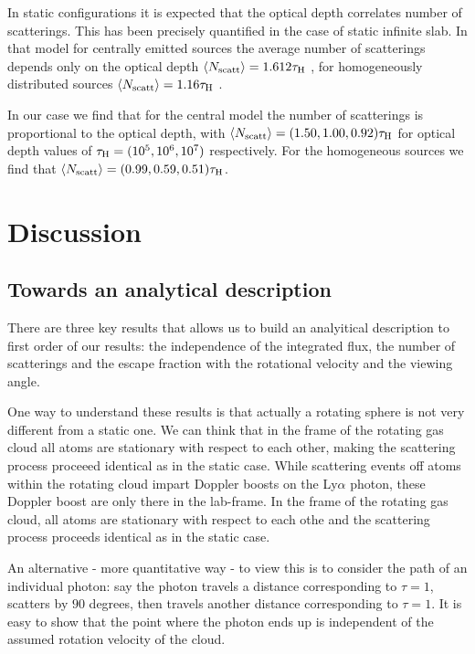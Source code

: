 \documentclass{emulateapj}
\begin{document}
In static configurations it is expected that the optical depth correlates number of
scatterings.  
This has been precisely quantified in the case of static infinite
slab. 
In that model for centrally emitted sources the average number of
scatterings depends only on the optical depth $\langle N_{\rm
  scatt}\rangle=1.612\tau_{\rm   H}$ \citep{Adams72,Harrington73}, for
homogeneously distributed sources $\langle N_{\rm
  scatt}\rangle=1.16\tau_{\rm   H}$ \citep{Harrington73}.

In our case we find that for the central model the number of
scatterings is proportional to the optical depth, with $\langle N_{\rm
  scatt}\rangle= (1.50, 1.00, 0.92)\tau_{\rm   H}$ for optical depth
values of $\tau_{\rm H} = (10^{5}, 10^{6}, 10^{7})$ respectively.
For the homogeneous sources we find that $\langle N_{\rm
  scatt}\rangle= (0.99, 0.59, 0.51)\tau_{\rm   H}$.





\section{Discussion}
\label{sec:discussion}

\subsection{Towards an analytical description}

There are three key results that allows us to build an analyitical description to
first order of our results: the independence of the integrated flux,
the number of scatterings and the escape fraction with the rotational
velocity and the viewing angle. 

One way to understand these results is that actually a rotating sphere
is not very different from a static one. We can think that in the
frame of the rotating gas cloud all atoms are stationary with respect
to each other, making the scattering process proceeed identical as in
the static case.  
While scattering events off atoms within the rotating cloud impart
Doppler boosts on the Ly$\alpha$ photon, these Doppler boost are only
there in the lab-frame.  
In the frame of the rotating gas cloud, all atoms are stationary with
respect to each othe and the scattering process proceeds identical as
in the static case.  

An alternative - more quantitative way - to view this is   to consider
the path of an individual photon: say the photon travels  a distance
corresponding to $\tau=1$, scatters by $90$ degrees, then travels
another distance corresponding to $\tau=1$. 
It is easy to show that the point where the photon ends up is
independent of the assumed rotation velocity of the cloud.
\end{document}
